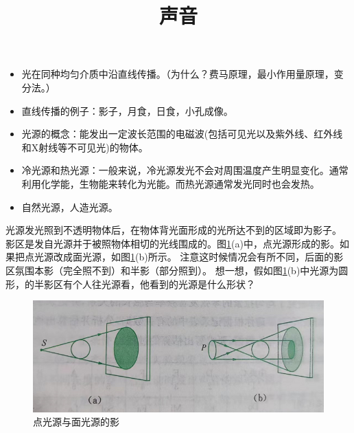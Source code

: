 \documentclass[windows,csize4, answers]{BHCexam}
\title{声音}
\begin{document}
\maketitle

\begin{groups}
    \begin{itemize}
        \item 光在同种均匀介质中沿直线传播。（为什么？费马原理，最小作用量原理，变分法。）
        \item 直线传播的例子：影子，月食，日食，小孔成像。
        \item 光源的概念：能发出一定波长范围的电磁波(包括可见光以及紫外线、红外线和X射线等不可见光)的物体。
        \item 冷光源和热光源：一般来说，冷光源发光不会对周围温度产生明显变化。通常利用化学能，生物能来转化为光能。而热光源通常发光同时也会发热。
        \item 自然光源，人造光源。
    \end{itemize} 

    光源发光照到不透明物体后，在物体背光面形成的光所达不到的区域即为影子。
    影区是发自光源并于被照物体相切的光线围成的。图\ref{fig:fig_3_1}(a)中，点光源形成的影。如果把点光源改成面光源，如图\ref{fig:fig_3_1}(b)所示。
    注意这时候情况会有所不同，后面的影区氛围本影（完全照不到）和半影（部分照到）。
    想一想，假如图\ref{fig:fig_3_1}(b)中光源为圆形，的半影区有个人往光源看，他看到的光源是什么形状？
    \begin{figure}[htb]
        \centering
        \includegraphics [scale=0.75,trim=0 0 0 0]{./image/fig_3_1.PNG}
        \caption{点光源与面光源的影}
        \label{fig:fig_3_1}
    \end{figure}


\end{groups}
\end{document}

